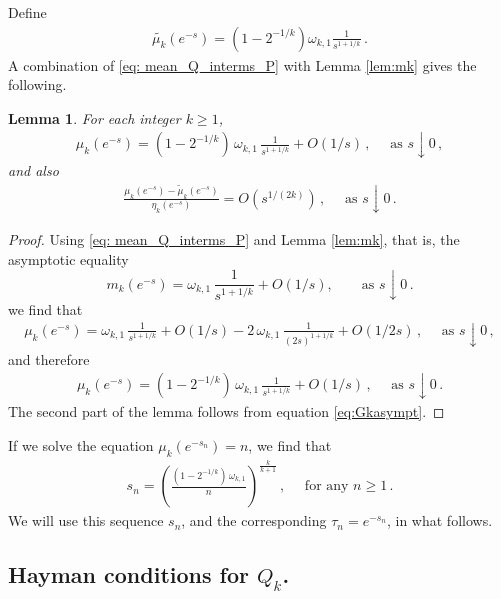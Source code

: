 \documentclass[12pt]{amsart}
\newtheorem{lemma}{Lemma}[section]
\theoremstyle{definition}
\begin{document}
Define
\begin{align*}
\tilde{\mu_k}(e^{-s}) = (1-2^{-1/k})\omega_{k,1}\frac{1}{s^{1+1/k}}\,.
\end{align*}
A combination of  \eqref{eq: mean_Q_interms_P} with Lemma \ref{lem:mk} gives the following.
\begin{lemma}\label{lem:asympt to muk}For each integer $k\ge 1$,
\begin{align*}
	\mu_k(e^{-s}) = (1-2^{-1/k})\,\omega_{k,1}\,\frac{1}{s^{1+1/k}}+O(1/s)\,, \quad \text{ as } s \downarrow 0\,,
\end{align*}
and also
\begin{align*}
\frac{	\mu_k(e^{-s}) -\tilde{\mu}_k(e^{-s})}{\eta_k(e^{-s})} = O(s^{1/(2k)})\,, \quad \text{ as } s \downarrow 0\,.
\end{align*}

\end{lemma}
\begin{proof} Using \eqref{eq: mean_Q_interms_P} and Lemma \ref{lem:mk}, that is, the asymptotic equality
\begin{equation}\label{eq:mkbis}
	m_k(e^{-s}) = \omega_{k,1}\,\frac{1}{s^{1+1/k}} + O\!\left({1}/{s}\right), \qquad \text{as } s\downarrow 0\,.
\end{equation}
we find that
\begin{align*}
\mu_k(e^{-s}) = \omega_{k,1}\,\frac{1}{s^{1+1/k}}+O(1/s)-2\,\omega_{k,1}\,\frac{1}{(2s)^{1+1/k}}+O(1/2s)\,, \quad \text{ as } s \downarrow 0\,,
\end{align*}
and therefore
\begin{align*}
	\mu_k(e^{-s}) = (1-2^{-1/k})\, \omega_{k,1}\,\frac{1}{s^{1+1/k}}+O(1/s)\,, \quad \text{ as } s \downarrow 0\,.
\end{align*}
The second part of the lemma follows from equation \eqref{eq:Gkasympt}.
\end{proof}

\medskip

If we solve the equation $\mu_{k}(e^{-s_{n}}) = n$, we find that
\begin{align}\label{eq:formula for sn de Qk}
s_n = \left(\frac{(1-2^{-1/k})\,\omega_{k,1}}{n}\right)^{\frac{k}{k+1}}\,, \quad \text{ for any } n \geq 1\,.
\end{align}
We will use this sequence $s_n$, and the corresponding $\tau_n = e^{-s_n}$, in what follows.

\subsection{Hayman conditions for $Q_k$.}
\end{document}
